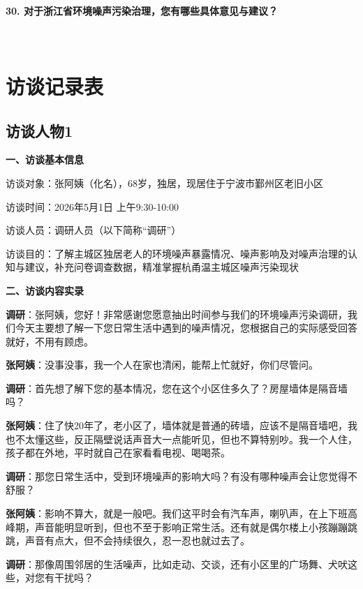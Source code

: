 \begin{appendices}
\textbf{30. 对于浙江省环境噪声污染治理，您有哪些具体意见与建议？}\\
\underline{\hspace{\textwidth}}\\
\underline{\hspace{\textwidth}}\\
\underline{\hspace{\textwidth}}

\section{访谈记录表}

\subsection{访谈人物1}

\textbf{一、访谈基本信息}

访谈对象：张阿姨（化名），68岁，独居，现居住于宁波市鄞州区老旧小区

访谈时间：2026年5月1日 上午9:30-10:00

访谈人员：调研人员（以下简称“调研”）

访谈目的：了解主城区独居老人的环境噪声暴露情况、噪声影响及对噪声治理的认知与建议，补充问卷调查数据，精准掌握杭甬温主城区噪声污染现状

\textbf{二、访谈内容实录}

\textbf{调研}：张阿姨，您好！非常感谢您愿意抽出时间参与我们的环境噪声污染调研，我们今天主要想了解一下您日常生活中遇到的噪声情况，您根据自己的实际感受回答就好，不用有顾虑。

\textbf{张阿姨}：没事没事，我一个人在家也清闲，能帮上忙就好，你们尽管问。

\textbf{调研}：首先想了解下您的基本情况，您在这个小区住多久了？房屋墙体是隔音墙吗？

\textbf{张阿姨}：住了快20年了，老小区了，墙体就是普通的砖墙，应该不是隔音墙吧，我也不太懂这些，反正隔壁说话声音大一点能听见，但也不算特别吵。我一个人住，孩子都在外地，平时就自己在家看看电视、喝喝茶。

\textbf{调研}：那您日常生活中，受到环境噪声的影响大吗？有没有哪种噪声会让您觉得不舒服？

\textbf{张阿姨}：影响不算大，就是一般吧。我们这平时会有汽车声，喇叭声，在上下班高峰期，声音能明显听到，但也不至于影响正常生活。还有就是偶尔楼上小孩蹦蹦跳跳，声音有点大，但不会持续很久，忍一忍也就过去了。

\textbf{调研}：那像周围邻居的生活噪声，比如走动、交谈，还有小区里的广场舞、犬吠这些，对您有干扰吗？


\end{appendices}
